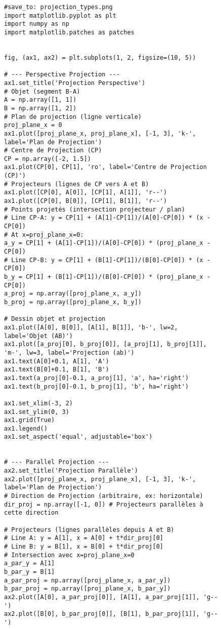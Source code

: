 \documentclass{article}
\begin{document}
\begin{figure}[H]
    \centering
    \begin{verbatim}
#save_to: projection_types.png
import matplotlib.pyplot as plt
import numpy as np
import matplotlib.patches as patches


fig, (ax1, ax2) = plt.subplots(1, 2, figsize=(10, 5))

# --- Perspective Projection ---
ax1.set_title('Projection Perspective')
# Objet (segment B-A)
A = np.array([1, 1])
B = np.array([1, 2])
# Plan de projection (ligne verticale)
proj_plane_x = 0
ax1.plot([proj_plane_x, proj_plane_x], [-1, 3], 'k-', label='Plan de Projection')
# Centre de Projection (CP)
CP = np.array([-2, 1.5])
ax1.plot(CP[0], CP[1], 'ro', label='Centre de Projection (CP)')
# Projecteurs (lignes de CP vers A et B)
ax1.plot([CP[0], A[0]], [CP[1], A[1]], 'r--')
ax1.plot([CP[0], B[0]], [CP[1], B[1]], 'r--')
# Points projetés (intersection projecteur / plan)
# Line CP-A: y = CP[1] + (A[1]-CP[1])/(A[0]-CP[0]) * (x - CP[0])
# At x=proj_plane_x=0:
a_y = CP[1] + (A[1]-CP[1])/(A[0]-CP[0]) * (proj_plane_x - CP[0])
# Line CP-B: y = CP[1] + (B[1]-CP[1])/(B[0]-CP[0]) * (x - CP[0])
b_y = CP[1] + (B[1]-CP[1])/(B[0]-CP[0]) * (proj_plane_x - CP[0])
a_proj = np.array([proj_plane_x, a_y])
b_proj = np.array([proj_plane_x, b_y])

# Dessin objet et projection
ax1.plot([A[0], B[0]], [A[1], B[1]], 'b-', lw=2, label='Objet (AB)')
ax1.plot([a_proj[0], b_proj[0]], [a_proj[1], b_proj[1]], 'm-', lw=3, label='Projection (ab)')
ax1.text(A[0]+0.1, A[1], 'A')
ax1.text(B[0]+0.1, B[1], 'B')
ax1.text(a_proj[0]-0.1, a_proj[1], 'a', ha='right')
ax1.text(b_proj[0]-0.1, b_proj[1], 'b', ha='right')

ax1.set_xlim(-3, 2)
ax1.set_ylim(0, 3)
ax1.grid(True)
ax1.legend()
ax1.set_aspect('equal', adjustable='box')


# --- Parallel Projection ---
ax2.set_title('Projection Parallèle')
ax2.plot([proj_plane_x, proj_plane_x], [-1, 3], 'k-', label='Plan de Projection')
# Direction de Projection (arbitraire, ex: horizontale)
dir_proj = np.array([-1, 0]) # Projecteurs parallèles à cette direction

# Projecteurs (lignes parallèles depuis A et B)
# Line A: y = A[1], x = A[0] + t*dir_proj[0]
# Line B: y = B[1], x = B[0] + t*dir_proj[0]
# Intersection avec x=proj_plane_x=0
a_par_y = A[1]
b_par_y = B[1]
a_par_proj = np.array([proj_plane_x, a_par_y])
b_par_proj = np.array([proj_plane_x, b_par_y])
ax2.plot([A[0], a_par_proj[0]], [A[1], a_par_proj[1]], 'g--')
ax2.plot([B[0], b_par_proj[0]], [B[1], b_par_proj[1]], 'g--')



\end{verbatim}
\end{figure}
\end{document}
